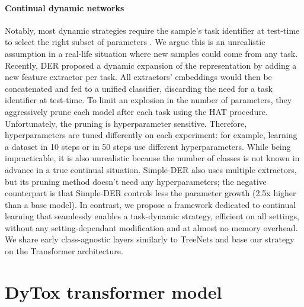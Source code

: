 \paragraph{Continual dynamic networks}  Notably, most dynamic strategies require the sample's task
identifier at test-time to select the right subset of parameters
\citep{fernando2017path_net,golkar2019neural_pruning}. We argue this is an unrealistic assumption in
a real-life situation where new samples could come from any task. Recently, DER \citep{yan2021der}
proposed a dynamic expansion of the representation by adding a new feature extractor per task. All
extractors' embeddings would then be concatenated and fed to a unified classifier, discarding the
need for a task identifier at test-time. To limit an explosion in the number of parameters, they
aggressively prune each model after each task using the HAT \citep{serra2018hat} procedure.
Unfortunately, the pruning is hyperparameter sensitive. Therefore, hyperparameters are tuned
differently on each experiment: for example, learning a dataset in 10 steps or in 50 steps use
different hyperparameters. While being impracticable, it is also unrealistic because the number of
classes is not known in advance in a true continual situation. Simple-DER \citep{li2021preserve}
also uses multiple extractors, but its pruning method doesn't need any hyperparameters; the negative
counterpart is that Simple-DER controls less the parameter growth (2.5x higher than a base model).
In contrast, we propose a framework dedicated to continual learning that seamlessly enables a
task-dynamic strategy, efficient on all settings, without any setting-dependant modification and at
almost no memory overhead. We share early class-agnostic \citep{olah2017feature} layers similarly to
TreeNets \citep{lee2015treenet} and base our strategy on the Transformer architecture.


\section{DyTox transformer model}
\label{sec:dytox_model}

